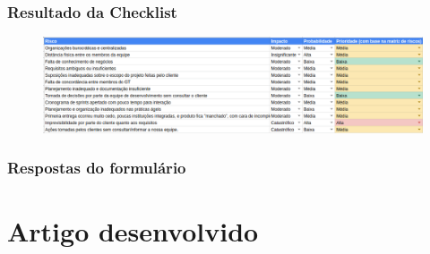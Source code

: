 \documentclass[
    12pt,       %
    openright,      %
    twoside,      %
    a4paper,      %
    english,      %
    french,       %
    spanish,      %
    brazil,       %
    ]{abntex2}
\begin{document}
\begin{apendicesenv}
\subsection{Resultado da Checklist}

\begin{figure}[H]
    \centering
    \includegraphics[width=1\textwidth]{src/tex/img/resultado-fruit.png}
\end{figure}

\subsection{Respostas do formulário}


 \chapter{Artigo desenvolvido}
 \label{sec:ApendiceD}


  \end{apendicesenv}
\end{document}
